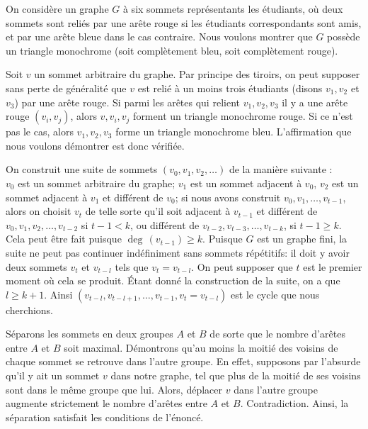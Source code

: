 \begin{sol}
On considère un graphe $G$ à six sommets représentants les étudiants, où deux sommets sont reliés par une arête rouge si les étudiants correspondants sont amis, et par une arête bleue dans le cas contraire. Nous voulons montrer que $G$ possède un triangle monochrome (soit complètement bleu, soit complètement rouge).

Soit $v$ un sommet arbitraire du graphe. Par principe des tiroirs, on peut supposer sans perte de généralité que $v$ est relié à un moins trois étudiants (disons $v_1, v_2 $ et $v_3$) par une arête rouge. Si parmi les arêtes qui relient $v_1, v_2, v_3$ il y a une arête rouge $(v_i,v_j)$, alors $v,v_i,v_j$ forment un triangle monochrome rouge. Si ce n’est pas le cas, alors $v_1,v_2,v_3$ forme un triangle monochrome bleu. L’affirmation que nous voulons démontrer est donc vérifiée.
\end{sol}


\begin{sol}
On construit une suite de sommets $(v_0, v_1, v_2,\ldots)$ de la manière suivante : \\
$v_0$ est un sommet arbitraire du graphe; $v_1$ est un sommet adjacent à $v_0$, $v_2$ est un sommet adjacent à $v_1$ et différent de $v_0$; si nous avons construit $v_0, v_1, \ldots, v_{t-1}$, alors on choisit $v_t$ de telle sorte qu’il soit adjacent à $v_{t-1}$ et différent de $v_0, v_1, v_2, \ldots, v_{t-2}$ si $t-1<k$, ou différent de $v_{t-2}, v_{t-3}, \ldots , v_{t-k}$, si $t-1\ge k$. Cela peut être fait puisque
$\deg\,(v_{t-1})\ge k.$ Puisque $G$ est un graphe fini, la suite ne peut pas continuer indéfiniment sans sommets répétitifs: il doit y avoir deux sommets $v_t$ et $v_{t-l}$ tels que $v_t = v_{t-l}$. On peut supposer que $t$ est le premier moment où cela se produit. Étant donné la construction de la suite, on a que $l\ge k + 1$. Ainsi $(v_{t-l}, v_{t-l+1}, \ldots, v_{t-1}, v_{t} = v_{t-l})$ est le cycle que nous cherchions.
\end{sol}


\begin{sol}
Séparons les sommets en deux groupes $A$ et $B$ de sorte que le nombre d’arêtes entre $A$ et $B$ soit maximal. Démontrons qu’au moins la moitié des voisins de chaque sommet se retrouve dans l’autre groupe. En effet, supposons par l’absurde qu’il y ait un sommet $v$ dans notre graphe, tel que plus de la moitié de ses voisins sont dans le même groupe que lui. Alors, déplacer $v$ dans l’autre groupe augmente strictement le nombre d’arêtes entre $A$ et $B$. Contradiction. Ainsi, la séparation satisfait les conditions de l’énoncé.
\end{sol}


